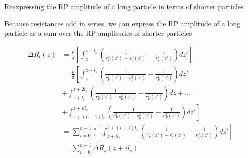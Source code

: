 \begin{frame}[c]{Reexpressing the RP amplitude of a long particle in terms of shorter particles}
	
	
	{\footnotesize
	Because resistances add in series, we can express the RP amplitude of a long particle as a sum over the RP amplitudes of shorter particles
	}
	
	
	{\scriptsize
		\begin{equation*}
			\begin{split}
				\Delta R_{l}\left(z\right) &= \frac{\rho}{\pi}\left[\int_{z}^{z+l_{p}}\left(\frac{1}{r_{P}^{2}\left(z'\right)-s_{p}^{2}\left(z'\right)}-\frac{1}{r_{P}^{2}\left(z'\right)}\right)dz'\right] \\
				&= \frac{\rho}{\pi}\left[\int_{z}^{z+l_{s}}\left(\frac{1}{r_{P}^{2}\left(z'\right)-s_{p}^{2}\left(z'\right)}-\frac{1}{r_{P}^{2}\left(z'\right)}\right)dz'\right. \\
				&+ \int_{z+l_{s}}^{z+2l_{s}}\left(\frac{1}{r_{P}^{2}\left(z'\right)-s_{p}^{2}\left(z'\right)}-\frac{1}{r_{P}^{2}\left(z'\right)}\right)dz + ...\\
				&+ \left.\int_{z+\left(n-1\right)l_{s}}^{z+nl_{s}}\left(\frac{1}{r_{P}^{2}\left(z'\right)-s_{p}^{2}\left(z'\right)}-\frac{1}{r_{P}^{2}\left(z'\right)}\right)dz'\right] \\
				&= \sum_{i=0}^{n-1}\frac{\rho}{\pi}\left[\int_{z+il_{s}}^{z+\left(i+1\right)l_{s}}\left(\frac{1}{r^{2}_{P}\left(z'\right)-s^{2}_{p}\left(z'\right)}-\frac{1}{r_{P}^{2}\left(z'\right)}\right)dz'\right] \\
				&= \sum_{i=0}^{n-1}\Delta R_{s}\left(z+il_{s}\right)
			\end{split}
		\end{equation*}
	}


		



\end{frame}





